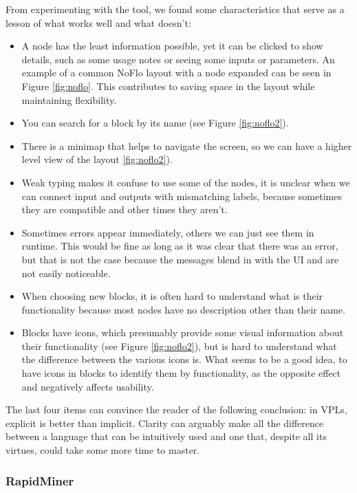 \begin{itemsize}
From experimenting with the tool, we found some characteristics that serve as a
lesson of what works well and what doesn't:

\begin{itemize}
  \item A node has the least information possible, yet it can be clicked to
show details, such as some usage notes or seeing some inputs or parameters.
An example of a common NoFlo layout with a node expanded can be seen in Figure
\ref{fig:noflo}. This contributes to saving space in the layout while maintaining
flexibility.
  \item You can search for a block by its name (see Figure \ref{fig:noflo2}).
  \item There is a minimap that helps to navigate the screen, so we can have
a higher level view of the layout \ref{fig:noflo2}).
  \item Weak typing makes it confuse to use some of the nodes, it is unclear
when we can connect input and outputs with mismatching labels, because sometimes
they are compatible and other times they aren't.
  \item Sometimes errors appear immediately, others we can just see them in
runtime. This would be fine as long as it was clear that there was an error,
but that is not the case because the messages blend in with the UI and are
not easily noticeable.
  \item When choosing new blocks, it is often hard to understand what is their
functionality because most nodes have no description other than their name.
  \item Blocks have icons, which presumably provide some visual information
about their functionality (see Figure \ref{fig:noflo2}), but is hard to
understand what the difference between the various icons is. What seems to be a
good idea, to have icons in blocks to identify them by functionality, as the
opposite effect and negatively affects usability.
\end{itemize}

The last four items can convince the reader of the following conclusion: in VPLs, explicit
is better than implicit. Clarity can arguably make all the
difference between a language that can be intuitively used and one that, despite
all its virtues, could take some more time to master.

\subsubsection{RapidMiner}


\end{itemsize}
